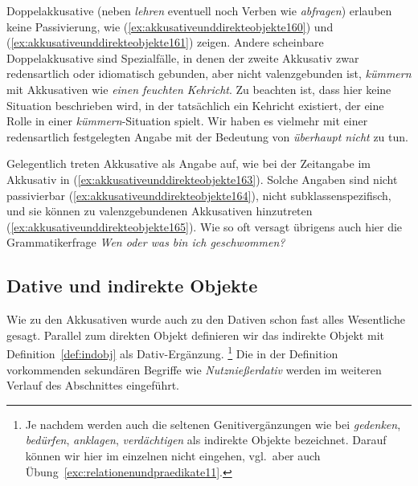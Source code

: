 
Doppelakkusative (neben \textit{lehren} eventuell noch Verben wie \textit{abfragen}) erlauben keine Passivierung, wie (\ref{ex:akkusativeunddirekteobjekte160}) und (\ref{ex:akkusativeunddirekteobjekte161}) zeigen.
Andere scheinbare Doppelakkusative sind Spezialfälle, in denen der zweite Akkusativ zwar redensartlich oder idiomatisch gebunden, aber nicht valenzgebunden ist, \zB \textit{kümmern} mit Akkusativen wie \textit{einen feuchten Kehricht}.
Zu beachten ist, dass hier keine Situation beschrieben wird, in der tatsächlich ein Kehricht existiert, der eine Rolle in einer \textit{kümmern}-Situation spielt.
Wir haben es vielmehr mit einer redensartlich festgelegten Angabe mit der Bedeutung von \textit{überhaupt nicht} zu tun.

Gelegentlich treten Akkusative als Angabe auf, wie bei der Zeitangabe im Akkusativ in (\ref{ex:akkusativeunddirekteobjekte163}).
Solche Angaben sind nicht passivierbar (\ref{ex:akkusativeunddirekteobjekte164}), nicht subklassenspezifisch, und sie können zu valenzgebundenen Akkusativen hinzutreten (\ref{ex:akkusativeunddirekteobjekte165}).
Wie so oft versagt übrigens auch hier die Grammatikerfrage \textit{Wen oder was bin ich geschwommen?}

\begin{exe}
  \ex\label{ex:akkusativeunddirekteobjekte162}
  \begin{xlist}
  \end{xlist}
\end{exe}

\subsection{Dative und indirekte Objekte}
\label{sec:dativeundindirekteobjekte}


Wie zu den Akkusativen wurde auch zu den Dativen schon fast alles Wesentliche gesagt.
Parallel zum direkten Objekt definieren wir das indirekte Objekt mit Definition~\ref{def:indobj} als Dativ-Ergänzung.%
\footnote{Je nachdem werden auch die seltenen Genitivergänzungen wie bei \textit{gedenken}, \textit{bedürfen}, \textit{anklagen}, \textit{verdächtigen} als indirekte Objekte bezeichnet.
Darauf können wir hier im einzelnen nicht eingehen, vgl.\ aber auch Übung~\ref{exc:relationenundpraedikate11}.}
Die in der Definition vorkommenden sekundären Begriffe wie \textit{Nutznießerdativ} werden im weiteren Verlauf des Abschnittes eingeführt.

